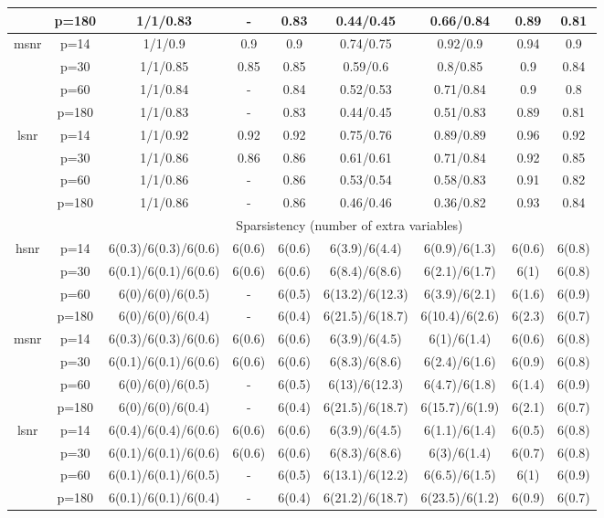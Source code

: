 \begin{table}[ht]
{\begin{tabular}{|c|c|ccccccc|}
   & p=180 & 1/1/0.83 & - & 0.83 & 0.44/0.45 & 0.66/0.84 & 0.89 & 0.81 \\ 
  \midrule\multirow{4}[2]{*}{msnr} & p=14 & 1/1/0.9 & 0.9 & 0.9 & 0.74/0.75 & 0.92/0.9 & 0.94 & 0.9 \\ 
   & p=30 & 1/1/0.85 & 0.85 & 0.85 & 0.59/0.6 & 0.8/0.85 & 0.9 & 0.84 \\ 
   & p=60 & 1/1/0.84 & - & 0.84 & 0.52/0.53 & 0.71/0.84 & 0.9 & 0.8 \\ 
   & p=180 & 1/1/0.83 & - & 0.83 & 0.44/0.45 & 0.51/0.83 & 0.89 & 0.81 \\ 
  \midrule\multirow{4}[2]{*}{lsnr} & p=14 & 1/1/0.92 & 0.92 & 0.92 & 0.75/0.76 & 0.89/0.89 & 0.96 & 0.92 \\ 
   & p=30 & 1/1/0.86 & 0.86 & 0.86 & 0.61/0.61 & 0.71/0.84 & 0.92 & 0.85 \\ 
   & p=60 & 1/1/0.86 & - & 0.86 & 0.53/0.54 & 0.58/0.83 & 0.91 & 0.82 \\ 
   & p=180 & 1/1/0.86 & - & 0.86 & 0.46/0.46 & 0.36/0.82 & 0.93 & 0.84 \\ 
   \midrule 
 \multicolumn{1}{|c}{} &       & \multicolumn{7}{c|}{Sparsistency (number of extra variables)} \\
\midrule\multirow{4}[2]{*}{hsnr} & p=14 & 6(0.3)/6(0.3)/6(0.6) & 6(0.6) & 6(0.6) & 6(3.9)/6(4.4) & 6(0.9)/6(1.3) & 6(0.6) & 6(0.8) \\ 
   & p=30 & 6(0.1)/6(0.1)/6(0.6) & 6(0.6) & 6(0.6) & 6(8.4)/6(8.6) & 6(2.1)/6(1.7) & 6(1) & 6(0.8) \\ 
   & p=60 & 6(0)/6(0)/6(0.5) & - & 6(0.5) & 6(13.2)/6(12.3) & 6(3.9)/6(2.1) & 6(1.6) & 6(0.9) \\ 
   & p=180 & 6(0)/6(0)/6(0.4) & - & 6(0.4) & 6(21.5)/6(18.7) & 6(10.4)/6(2.6) & 6(2.3) & 6(0.7) \\ 
  \midrule\multirow{4}[2]{*}{msnr} & p=14 & 6(0.3)/6(0.3)/6(0.6) & 6(0.6) & 6(0.6) & 6(3.9)/6(4.5) & 6(1)/6(1.4) & 6(0.6) & 6(0.8) \\ 
   & p=30 & 6(0.1)/6(0.1)/6(0.6) & 6(0.6) & 6(0.6) & 6(8.3)/6(8.6) & 6(2.4)/6(1.6) & 6(0.9) & 6(0.8) \\ 
   & p=60 & 6(0)/6(0)/6(0.5) & - & 6(0.5) & 6(13)/6(12.3) & 6(4.7)/6(1.8) & 6(1.4) & 6(0.9) \\ 
   & p=180 & 6(0)/6(0)/6(0.4) & - & 6(0.4) & 6(21.5)/6(18.7) & 6(15.7)/6(1.9) & 6(2.1) & 6(0.7) \\ 
  \midrule\multirow{4}[2]{*}{lsnr} & p=14 & 6(0.4)/6(0.4)/6(0.6) & 6(0.6) & 6(0.6) & 6(3.9)/6(4.5) & 6(1.1)/6(1.4) & 6(0.5) & 6(0.8) \\ 
   & p=30 & 6(0.1)/6(0.1)/6(0.6) & 6(0.6) & 6(0.6) & 6(8.3)/6(8.6) & 6(3)/6(1.4) & 6(0.7) & 6(0.8) \\ 
   & p=60 & 6(0.1)/6(0.1)/6(0.5) & - & 6(0.5) & 6(13.1)/6(12.2) & 6(6.5)/6(1.5) & 6(1) & 6(0.9) \\ 
   & p=180 & 6(0.1)/6(0.1)/6(0.4) & - & 6(0.4) & 6(21.2)/6(18.7) & 6(23.5)/6(1.2) & 6(0.9) & 6(0.7) \\ 
   \bottomrule 
\end{tabular}
}
\end{table}
